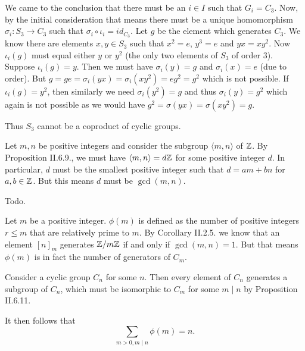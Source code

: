 \begin{solution}
	We came to the conclusion that there must be an $i \in I$ such that $G_i = C_3$. Now, by the initial consideration that means there must be a unique homomorphism $\sigma_i: S_3 \to C_3$ such that $\sigma_i \circ \iota_i = id_{C_3}$. Let $g$ be the element which generates $C_3$. We know there are elements $x, y \in S_3$ such that $x^2 = e$, $y^3 = e$ and $yx = xy^2$. Now $\iota_i(g)$ must equal either $y$ or $y^2$ (the only two elements of $S_3$ of order $3$). Suppose $\iota_i(g) = y$. Then we must have $\sigma_i(y) = g$ and $\sigma_i(x) = e$ (due to order). But $g = g e = \sigma_i(y x) = \sigma_i(x y^2) = e g^2 = g^2$ which is not possible. If $\iota_i(g) = y^2$, then similarly we need $\sigma_i(y^2) = g$ and thus $\sigma_i(y) = g^2$ which again is not possible as we would have $g^2 = \sigma(y x) = \sigma(x y^2) = g$.
	
	Thus $S_3$ cannot be a coproduct of cyclic groups.
\end{solution}

\begin{problem}
\end{problem}

\begin{solution}
	Let $m, n$ be positive integers and consider the subgroup $\langle m, n \rangle$ of $\mathbb{Z}$. By Proposition II.6.9., we must have $\langle m, n \rangle = d\mathbb{Z}$ for some positive integer $d$. In particular, $d$ must be the smallest positive integer such that $d = am + bn$ for $a, b \in \mathbb{Z}$. But this means $d$ must be $\gcd(m, n)$.
\end{solution}

\begin{problem}
\end{problem}

\begin{solution}
	Todo.
\end{solution}

\begin{problem}
\end{problem}

\begin{solution}
	Let $m$ be a positive integer. $\phi(m)$ is defined as the number of positive integers $r \leq m$ that are relatively prime to $m$. By Corollary II.2.5. we know that an element $[n]_m$ generates $\mathbb{Z}/m\mathbb{Z}$ if and only if $\gcd(m, n) = 1$. But that means $\phi(m)$ is in fact the number of generators of $C_m$.
	
	Consider a cyclic group $C_n$ for some $n$. Then every element of $C_n$ generates a subgroup of $C_n$, which must be isomorphic to $C_m$ for some $m \mid n$ by Proposition II.6.11.
	
	It then follows that \[\sum_{m>0, m \mid n} \phi(m) = n \text{.}\]
\end{solution}

